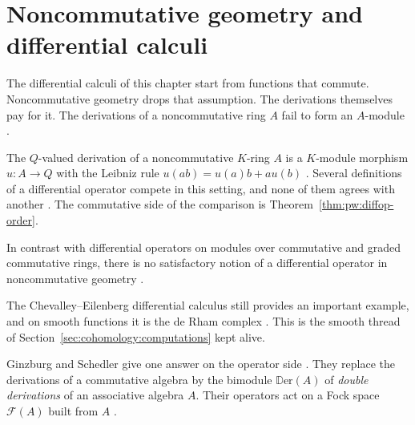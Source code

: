 \section{Noncommutative geometry and differential calculi}\label{sec:cohomology:noncommutative-geometry}

The differential calculi of this chapter start from functions that commute.
Noncommutative geometry drops that assumption.
The derivations themselves pay for it. The derivations of a
noncommutative ring $A$ fail to form an $A$-module
\cite[Abstract, p.~1]{Sardanashvily2007Dilemma}. %

The $Q$-valued derivation of a noncommutative $K$-ring $A$ is a
$K$-module morphism $u\colon A\to Q$ with the Leibniz rule
$u(ab)=u(a)b+au(b)$ \cite[p.~1]{Sardanashvily2007Dilemma}. Several
definitions of a differential operator compete in this setting, and none
of them agrees with another \cite[Abstract, p.~1]{Sardanashvily2007Dilemma}.
The commutative side of the comparison is
Theorem~\ref{thm:pw:diffop-order}. %

\begin{remark}
\label{rem:cohomology:ncg-dilemma}
In contrast with differential operators on modules over commutative and
graded commutative rings, there is no satisfactory notion of a
differential operator in noncommutative geometry
\cite[Abstract, p.~1]{Sardanashvily2007Dilemma}.
\end{remark}

The Chevalley--Eilenberg differential calculus still provides an
important example, and on smooth functions it is the de Rham complex
\cite[p.~1]{Sardanashvily2007Dilemma}. This is the smooth thread of
Section~\ref{sec:cohomology:computations} kept alive. %

Ginzburg and Schedler give one answer on the operator side
\cite[Abstract, p.~673]{GinzburgSchedler2010BV}. They replace
the derivations of a commutative algebra by the bimodule
$\mathbb{D}\mathrm{er}(A)$ of \emph{double derivations} of an associative
algebra $A$. Their operators act on a Fock space $\mathcal{F}(A)$ built
from $A$ \cite[Abstract, p.~673]{GinzburgSchedler2010BV}.

